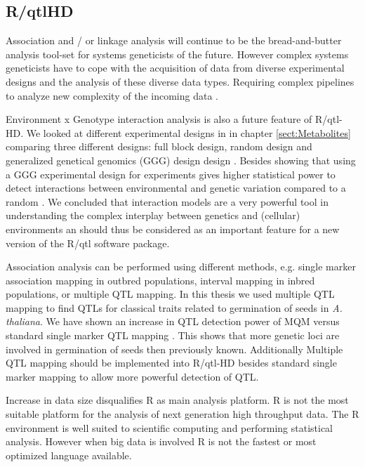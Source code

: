 \subsection{R/qtlHD}
\label{subsect:qtlHD}
Association and / or linkage analysis will continue to be the bread-and-butter analysis 
tool-set for systems geneticists of the future. However complex systems geneticists have 
to cope with the acquisition of data from diverse experimental designs and the analysis of 
these diverse data types. Requiring complex pipelines to analyze new complexity of the 
incoming data \cite{Trelles:2011}.

Environment x Genotype interaction analysis is also a future feature of R/qtl-HD. We looked at 
different experimental designs in in chapter \ref{sect:Metabolites} comparing three different 
designs: full block design, random design and generalized genetical genomics (GGG) design design 
\cite{Joosen:2013, Li:2009}. Besides showing that using a GGG experimental design for experiments 
gives higher statistical power to detect interactions between environmental and genetic variation 
compared to a random \cite{Joosen:2013}. We concluded that interaction models are a very powerful 
tool in understanding the complex interplay between genetics and (cellular) environments 
\cite{Joosen:2013} an should thus be considered as an important feature for a new version of the 
R/qtl software package.

Association analysis can be performed using different methods, e.g. single marker association 
mapping in outbred populations, interval mapping in inbred populations, or multiple QTL mapping. 
In this thesis we used multiple QTL mapping to find QTLs for classical traits related to 
germination of seeds in \emph{A. thaliana}. We have shown an increase in QTL detection power 
of MQM versus standard single marker QTL mapping \cite{Jansen:1994a, Joosen:2011}. This shows 
that more genetic loci are involved in germination of seeds then previously known. Additionally 
Multiple QTL mapping should be implemented into R/qtl-HD besides standard single marker mapping 
to allow more powerful detection of QTL.

Increase in data size disqualifies R as main analysis platform. R is not the most suitable 
platform for the analysis of next generation high throughput data. The R environment is 
well suited to scientific computing and performing statistical analysis. However when big data 
is involved R is not the fastest or most optimized language available. 

